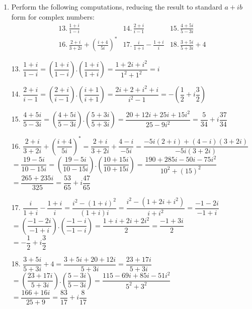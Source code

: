 \documentclass[fleqn]{article}
\begin{document}
\begin{enumerate}

  \item  Perform  the following computations, reducing the result to
  standard $a+ib$ form for complex numbers: 
  \[
  \begin{array}{lll}
  13.\,\frac{\textstyle 1+i}{\textstyle 1-i} & 14.\,\frac{\textstyle 2+i}{\textstyle i-1} & 15.\,\frac{\textstyle 4+5i}{\textstyle 5-3i} \\ 
  16.\,\frac{\textstyle 2+i}{\textstyle 3+2i}+\left( \frac{\textstyle i+4}{\textstyle 5i}\right)^{\ast} & 17.\,\frac{\textstyle i}{\textstyle 1+i}-\frac{\textstyle 1+i}{\textstyle i} & 18.\,\frac{\textstyle 3+5i}{\textstyle 5+3i}+4
  \end{array}
  \]
  
    \textcolor{hwColor}{
      13. $\dfrac{1+i}{1-i}=(\dfrac{1+i}{1-i}).(\dfrac{1+i}{1+i})=\dfrac{1+2i+i^2}{1^2+1^2}=i$
    }

    \textcolor{hwColor}{
      14. $\dfrac{2+i}{i-1}=(\dfrac{2+i}{i-1}).(\dfrac{i+1}{i+1})=\dfrac{2i+2+i^2+i}{i^2-1}=-(\dfrac{1}{2}+i\dfrac{3}{2})$
    }
    
    \textcolor{hwColor}{
      15. $\dfrac{4+5i}{5-3i}=(\dfrac{4+5i}{5-3i}).(\dfrac{5+3i}{5+3i})=\dfrac{20+12i+25i+15i^2}{25-9i^2}=\dfrac{5}{34}+i\dfrac{37}{34}$
    }

    \textcolor{hwColor}{
      16. $\dfrac{2+i}{3+2i}+(\dfrac{i+4}{5i})^*=\dfrac{2+i}{3+2i}+\dfrac{4-i}{-5i}=\dfrac{-5i(2+i)+(4-i)(3+2i)}{-5i(3+2i)}$ \\
      $=\dfrac{19-5i}{10-15i}=(\dfrac{19-5i}{10-15i}).(\dfrac{10+15i}{10+15i})=\dfrac{190+285i-50i-75i^2}{10^2+(15)^2}$ \\
      $=\dfrac{265+235i}{325}=\dfrac{53}{65}+i\dfrac{47}{65}$ \\
    }

    \textcolor{hwColor}{
      17. $\dfrac{i}{1+i}-\dfrac{1+i}{i}=\dfrac{i^2-(1+i)^2}{(1+i)i}=\dfrac{i^2-(1+2i+i^2)}{i+i^2}=\dfrac{-1-2i}{-1+i}$ \\
      $=(\dfrac{-1-2i}{-1+i}).(\dfrac{-1-i}{-1-i})=\dfrac{1+i+2i+2i^2}{2}=\dfrac{-1+3i}{2}$ \\
      $=-\dfrac{1}{2}+i\dfrac{3}{2}$ \\
    }

    \textcolor{hwColor}{
      18. $\dfrac{3+5i}{5+3i}+4=\dfrac{3+5i+20+12i}{5+3i}=\dfrac{23+17i}{5+3i}$ \\
      $=(\dfrac{23+17i}{5+3i}).(\dfrac{5-3i}{5-3i})=\dfrac{115-69i+85i-51i^2}{5^2+3^2}$ \\
      $=\dfrac{166+16i}{25+9}=\dfrac{83}{17}+i\dfrac{8}{17}$ \\
    }
  

\end{enumerate}
\end{document}
